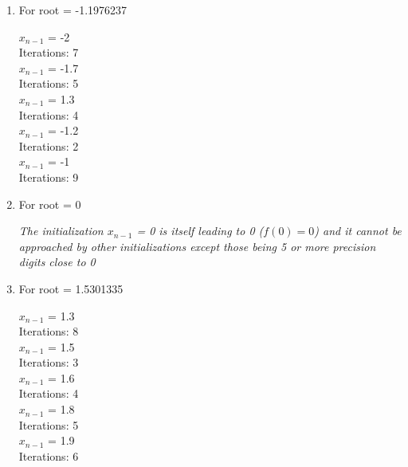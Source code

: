 \documentclass{article}
\begin{document}
\begin{tcolorbox}[colback=blue!10, colframe=gray!80, width=\textwidth, sharp corners]

\begin{enumerate}

\item For root = -1.1976237
\begin{center}

    $x_{n-1}$ = -2\\
    Iterations: 7\\
    \vspace{0.3cm}
    $x_{n-1}$ = -1.7\\
    Iterations: 5\\
    \vspace{0.3cm}
    $x_{n-1}$ = 1.3\\
    Iterations: 4\\
    \vspace{0.3cm}
    $x_{n-1}$ = -1.2\\
    Iterations: 2\\
    \vspace{0.3cm}
    $x_{n-1}$ = -1\\
    Iterations: 9\\
      
\end{center}

\item For root = 0
\begin{center}
    \textit{The initialization $x_{n-1}$  = 0 is itself leading to 0 ($f(0)=0 $) and it cannot be approached by other initializations except those being 5 or more precision digits close to 0 }
\end{center}
\item For root = 1.5301335
\begin{center}

    $x_{n-1}$ = 1.3\\
    Iterations: 8\\
    \vspace{0.3cm}
    $x_{n-1}$ = 1.5\\
    Iterations: 3\\
    \vspace{0.3cm}
    $x_{n-1}$ = 1.6\\
    Iterations: 4\\
    \vspace{0.3cm}
    $x_{n-1}$ = 1.8\\
    Iterations: 5\\
    \vspace{0.3cm}
    $x_{n-1}$ = 1.9\\
    Iterations: 6\\
      
\end{center}




\end{enumerate}
\end{tcolorbox}
\end{document}
